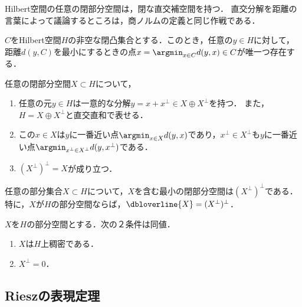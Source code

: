 \documentclass[uplatex,dvipdfmx]{jsreport}
\begin{document}
\begin{tcolorbox}[colframe=ForestGreen, colback=ForestGreen!10!white,breakable,colbacktitle=ForestGreen!40!white,coltitle=black,fonttitle=\bfseries\sffamily,
title=]
    Hilbert空間の任意の閉部分空間は，閉な直交補空間を持つ．
    直交分解を距離の言葉によって議論するところは，商ノルムの定義と同じ作戦である．
\end{tcolorbox}

\begin{lemma}
    $C$をHilbert空間$H$の非空な閉凸集合とする．このとき，任意の$y\in H$に対して，距離$d(y,C)$を最小にするときの点$x=\argmin_{x\in C}d(y,x)\in C$が唯一つ存在する．
\end{lemma}

\begin{theorem}
    任意の閉部分空間$X\subset H$について，
    \begin{enumerate}
        \item 任意の元$y\in H$は一意的な分解$y=x+x^\perp\in X\oplus X^\perp$を持つ．
        また，$H=X\oplus X^\perp$と直交直和で表せる．
        \item この$x\in X$は$y$に一番近い点$\argmin_{x\in X} d(y,x)$であり，$x^\perp\in X^\perp$も$y$に一番近い点$\argmin_{x^\perp\in X^\perp} d(y,x^\perp)$である．
        \item $(X^\perp)^\perp=X$が成り立つ．
    \end{enumerate}
\end{theorem}

\begin{corollary}\label{cor-expression-of-closed-linear-span}
    任意の部分集合$X\subset H$について，$X$を含む最小の閉部分空間は$(X^\perp)^\perp$である．
    特に，$X$が$H$の部分空間ならば，$\dbloverline{X}=(X^\perp)^\perp$．
\end{corollary}

\begin{corollary}[部分空間の稠密性の直交補空間による特徴付け]\label{cor-dense-subspace}
    $X$を$H$の部分空間とする．次の２条件は同値．
    \begin{enumerate}
        \item $X$は$H$上稠密である．
        \item $X^\perp=0$．
    \end{enumerate}
\end{corollary}

\subsection{Rieszの表現定理}
\end{document}
